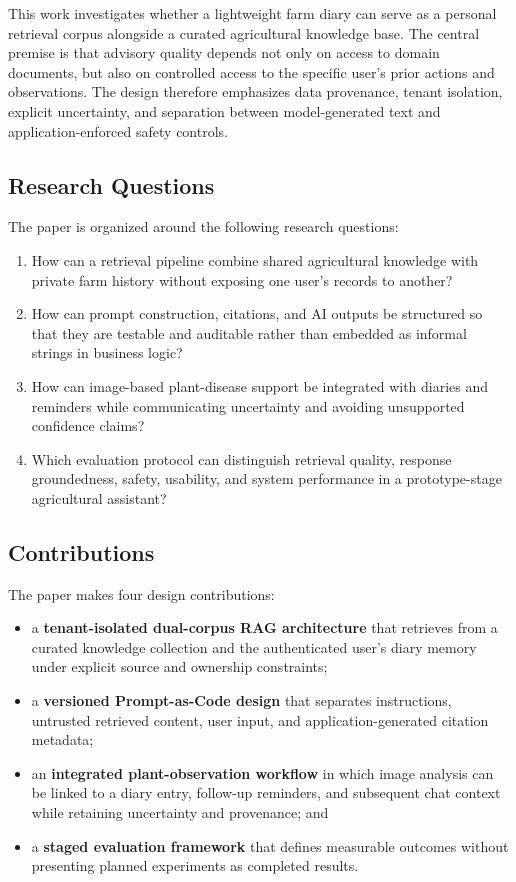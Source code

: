 \documentclass[conference]{IEEEtran}
\begin{document}
This work investigates whether a lightweight farm diary can serve as a personal retrieval corpus alongside a curated agricultural knowledge base. The central premise is that advisory quality depends not only on access to domain documents, but also on controlled access to the specific user's prior actions and observations. The design therefore emphasizes data provenance, tenant isolation, explicit uncertainty, and separation between model-generated text and application-enforced safety controls.

\subsection{Research Questions}

The paper is organized around the following research questions:
\begin{enumerate}
    \item How can a retrieval pipeline combine shared agricultural knowledge with private farm history without exposing one user's records to another?
    \item How can prompt construction, citations, and AI outputs be structured so that they are testable and auditable rather than embedded as informal strings in business logic?
    \item How can image-based plant-disease support be integrated with diaries and reminders while communicating uncertainty and avoiding unsupported confidence claims?
    \item Which evaluation protocol can distinguish retrieval quality, response groundedness, safety, usability, and system performance in a prototype-stage agricultural assistant?
\end{enumerate}

\subsection{Contributions}

The paper makes four design contributions:
\begin{itemize}
    \item a \textbf{tenant-isolated dual-corpus RAG architecture} that retrieves from a curated knowledge collection and the authenticated user's diary memory under explicit source and ownership constraints;
    \item a \textbf{versioned Prompt-as-Code design} that separates instructions, untrusted retrieved content, user input, and application-generated citation metadata;
    \item an \textbf{integrated plant-observation workflow} in which image analysis can be linked to a diary entry, follow-up reminders, and subsequent chat context while retaining uncertainty and provenance; and
    \item a \textbf{staged evaluation framework} that defines measurable outcomes without presenting planned experiments as completed results.
\end{itemize}
\end{document}
